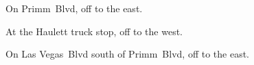 
\begin{LocationList}

On Primm~Blvd, off  to the east.

At the Haulett truck stop, off  to the west.

On Las Vegas~Blvd south of Primm~Blvd, off  to the east.

\end{LocationList}
